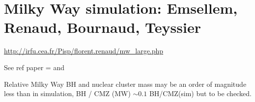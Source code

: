 \section{Milky Way simulation: Emsellem, Renaud, Bournaud, Teyssier}

\url{http://irfu.cea.fr/Pisp/florent.renaud/mw_large.php}

See ref paper = \cite{Renaud_2013} and \cite{Emsellem_2014}

Relative Milky Way BH and nuclear cluster mass may be an order of magnitude less than in simulation, BH / CMZ (MW) $\sim0.1$ BH/CMZ(sim) but to be checked.